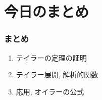 














\section{今日のまとめ}
\begin{frame}
\frametitle{まとめ}   


\begin{enumerate}
\item テイラーの定理の証明
\item テイラー展開, 解析的関数
\item 応用, オイラーの公式
\end{enumerate} 

\end{frame}
